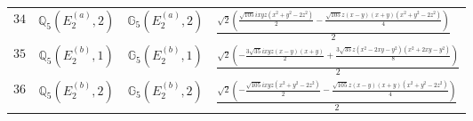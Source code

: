 \documentclass[fleqn,8pt,landscape]{jsarticle}
\begin{document}
\begin{table}[ht!]
\begin{center}
\begin{tabular}{cccl}
$ 34 $ & $ \mathbb{Q}_{5}(E_{2}^{(a)},2) $ & $ \mathbb{G}_{5}(E_{2}^{(a)},2) $ & $ \frac{\sqrt{2} \left(\frac{\sqrt{105} i x y z \left(x^{2} + y^{2} - 2 z^{2}\right)}{2} - \frac{\sqrt{105} z \left(x - y\right) \left(x + y\right) \left(x^{2} + y^{2} - 2 z^{2}\right)}{4}\right)}{2} $ \\
$ 35 $ & $ \mathbb{Q}_{5}(E_{2}^{(b)},1) $ & $ \mathbb{G}_{5}(E_{2}^{(b)},1) $ & $ \frac{\sqrt{2} \left(- \frac{3 \sqrt{35} i x y z \left(x - y\right) \left(x + y\right)}{2} + \frac{3 \sqrt{35} z \left(x^{2} - 2 x y - y^{2}\right) \left(x^{2} + 2 x y - y^{2}\right)}{8}\right)}{2} $ \\
$ 36 $ & $ \mathbb{Q}_{5}(E_{2}^{(b)},2) $ & $ \mathbb{G}_{5}(E_{2}^{(b)},2) $ & $ \frac{\sqrt{2} \left(- \frac{\sqrt{105} i x y z \left(x^{2} + y^{2} - 2 z^{2}\right)}{2} - \frac{\sqrt{105} z \left(x - y\right) \left(x + y\right) \left(x^{2} + y^{2} - 2 z^{2}\right)}{4}\right)}{2} $ \\
 \hline \hline
\end{tabular}
\end{center}
\end{table}
\end{document}
